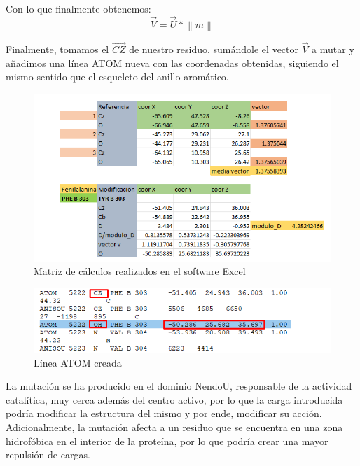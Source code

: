 \documentclass[12pt]{article}
\begin{document}
Con lo que finalmente obtenemos:
\begin{equation}
\overrightarrow{V}=\overrightarrow{U} * \left\| m \right\|
\end{equation}

Finalmente, tomamos el $\overrightarrow{CZ}$ de nuestro residuo, sumándole el vector $\overrightarrow{V}$ a mutar y añadimos una línea ATOM nueva con las coordenadas obtenidas, siguiendo el mismo sentido que el esqueleto del anillo aromático.

\begin{figure}[H]
\centering
\includegraphics[scale=0.7]{Screenshot_44}
\caption{Matriz de cálculos realizados en el software Excel}
\end{figure}


\begin{figure}[H]
\centering
\includegraphics[scale=0.7]{Screenshot_45}
\caption{Línea ATOM creada}
\end{figure}

La mutación se ha producido en el dominio NendoU, responsable de la actividad catalítica, muy cerca además del centro activo, por lo que la carga introducida podría modificar la estructura del mismo y por ende, modificar su acción. Adicionalmente, la mutación afecta a un residuo que se encuentra en una zona hidrofóbica en el interior de la proteína, por lo que podría crear una mayor repulsión de cargas.
\end{document}
